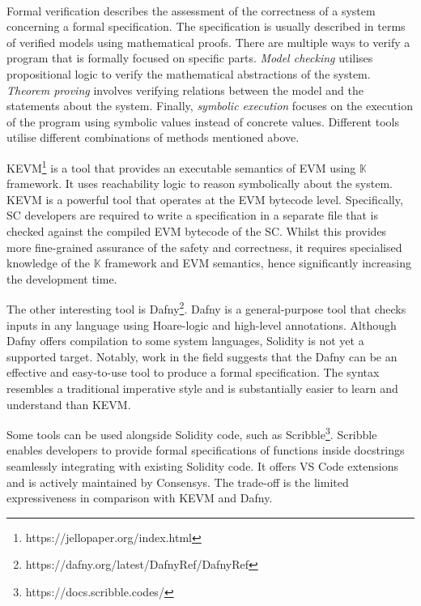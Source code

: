 \documentclass[oneside]{ecsproject}     %
\begin{document}
\paragraph*{}
Formal verification describes the assessment of the correctness of a system concerning a formal specification\cite{eth_formal_verification}. 
The specification is usually described
in terms of verified models using mathematical proofs. There are multiple ways to verify a program
that is formally focused on specific parts. \textit{Model checking} utilises propositional logic 
to verify the mathematical abstractions of the system. \textit{Theorem proving} involves verifying
relations between the model and the statements about the system. Finally, \textit{symbolic execution} focuses
on the execution of the program using symbolic values instead of concrete values\cite{eth_formal_verification}.
Different tools utilise different combinations of methods mentioned above.

KEVM\footnote{https://jellopaper.org/index.html} is a tool that provides an executable semantics of EVM using $\mathbb{K}$ framework. 
It uses reachability logic to reason symbolically about the system\cite{kevm}. KEVM is a powerful tool that operates at the EVM bytecode level.
Specifically, SC developers are required to write a specification in a separate file that is checked against the compiled EVM bytecode of the SC.
Whilst this provides more fine-grained assurance of the safety and correctness, it requires specialised knowledge of the $\mathbb{K}$ framework and EVM
semantics, hence significantly increasing the development time.

The other interesting tool is Dafny\footnote{https://dafny.org/latest/DafnyRef/DafnyRef}. Dafny is a general-purpose tool that checks inputs in any language 
using Hoare-logic and high-level annotations. Although Dafny offers compilation to some system languages, Solidity is not yet a supported target. 
Notably, work in the field suggests that the Dafny can be an effective and easy-to-use tool to produce a formal specification\cite{dafny_deductive}.
The syntax resembles a traditional imperative style and is substantially easier to learn and understand than KEVM.

Some tools can be used alongside Solidity code, such as Scribble\footnote{https://docs.scribble.codes/}. 
Scribble enables developers to provide formal specifications of functions inside docstrings seamlessly integrating with existing Solidity code. 
It offers VS Code extensions and is actively maintained by Consensys. 
The trade-off is the limited expressiveness in comparison with KEVM and Dafny.
\end{document}
